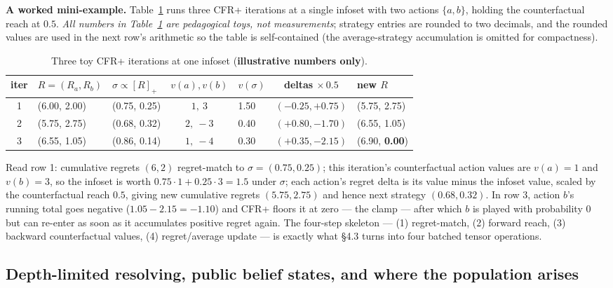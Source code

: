 \documentclass[11pt]{article}
\begin{document}
\textbf{A worked mini-example.} Table~\ref{tab:toy} runs three CFR+ iterations at a
single infoset with two actions $\{a, b\}$, holding the counterfactual reach at $0.5$.
\emph{All numbers in Table~\ref{tab:toy} are pedagogical toys, not measurements};
strategy entries are rounded to two decimals, and the rounded values are used in the
next row's arithmetic so the table is self-contained (the average-strategy accumulation
is omitted for compactness).

\begin{table}[t]
\centering
\caption{Three toy CFR+ iterations at one infoset (\textbf{illustrative numbers only}).}
\label{tab:toy}
\small
\begin{tabular}{cllclcl}
\toprule
iter & $R = (R_a, R_b)$ & $\sigma \propto [R]_+$ & $v(a), v(b)$ & $v(\sigma)$ & deltas $\times\,0.5$ & new $R$ \\
\midrule
1 & (6.00, 2.00) & (0.75, 0.25) & $1,\ 3$ & 1.50 & $(-0.25, +0.75)$ & (5.75, 2.75) \\
2 & (5.75, 2.75) & (0.68, 0.32) & $2,\ -3$ & 0.40 & $(+0.80, -1.70)$ & (6.55, 1.05) \\
3 & (6.55, 1.05) & (0.86, 0.14) & $1,\ -4$ & 0.30 & $(+0.35, -2.15)$ & (6.90, \textbf{0.00}) \\
\bottomrule
\end{tabular}
\end{table}

Read row 1: cumulative regrets $(6, 2)$ regret-match to $\sigma = (0.75, 0.25)$; this
iteration's counterfactual action values are $v(a) = 1$ and $v(b) = 3$, so the infoset
is worth $0.75 \cdot 1 + 0.25 \cdot 3 = 1.5$ under $\sigma$; each action's regret delta
is its value minus the infoset value, scaled by the counterfactual reach $0.5$, giving
new cumulative regrets $(5.75, 2.75)$ and hence next strategy $(0.68, 0.32)$. In row 3,
action $b$'s running total goes negative ($1.05 - 2.15 = -1.10$) and CFR+ floors it at
zero --- the clamp --- after which $b$ is played with probability 0 but can re-enter as
soon as it accumulates positive regret again. The four-step skeleton --- (1)
regret-match, (2) forward reach, (3) backward counterfactual values, (4) regret/average
update --- is exactly what \S4.3 turns into four batched tensor operations.

\subsection{Depth-limited resolving, public belief states, and where the population arises}
\end{document}
